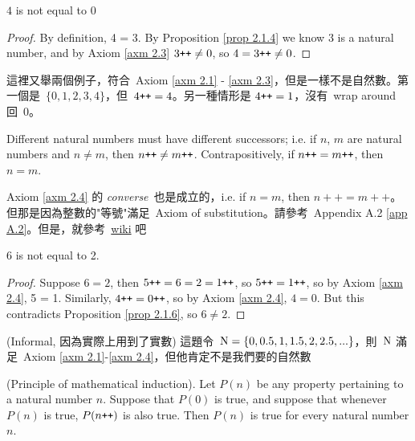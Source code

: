 \begin{proposition}\label{prop 2.1.6}
\(4\) is not equal to \(0\)
\begin{proof}
By definition, 4 = 3\INC. By Proposition \ref{prop 2.1.4} we know 3 is a natural number, and by Axiom \ref{axm 2.3} \(3\texttt{++} \neq 0\), so \(4 = 3\texttt{++} \neq 0\).
\end{proof}
\end{proposition}

\begin{example}\label{example 2.1.7}
這裡又舉兩個例子，符合\ Axiom \ref{axm 2.1} - \ref{axm 2.3}，但是一樣不是自然數。第一個是\ \(\{0,1,2,3,4\}\)，但\ \(4\texttt{++} = 4\)。另一種情形是 \(4\texttt{++} = 1\)，沒有\ wrap around 回\ 0。
\end{example}

\begin{axiom}\label{axm 2.4}
Different natural numbers must have different successors; i.e. if \(n\), \(m\) are natural numbers and \(n \neq m\), then \(n\texttt{++} \neq m\texttt{++}\). Contrapositively, if \(n\texttt{++} = m\texttt{++}\), then \(n = m\).
\end{axiom}

\begin{note}
Axiom \ref{axm 2.4} 的 \emph{converse}\ 也是成立的，i.e. if \(n = m\), then \(n++ = m++\)。但那是因為整數的"等號"滿足\ Axiom of substitution。請參考\ Appendix A.2 \ref{app A.2}。但是，就參考\ \href{https://www.wikiwand.com/en/Peano_axioms#/Formulation}{wiki} 吧
\end{note}

\begin{proposition}\label{prop 2.1.8}
6 is not equal to 2.
\begin{proof}
Suppose \( 6 = 2 \), then \( 5\texttt{++} = 6 = 2 = 1\texttt{++} \), so \(5\texttt{++} = 1\texttt{++} \), so by Axiom \ref{axm 2.4}, 5 = 1. Similarly, \(4\texttt{++} = 0\texttt{++}\), so by Axiom \ref{axm 2.4}, \(4 = 0\). But this contradicts Proposition \ref{prop 2.1.6}, so \(6 \neq 2\).
\end{proof}
\end{proposition}

\begin{example}\label{example 2.1.9}(Informal, 因為實際上用到了實數)
這題令\ \( \textup{N} = \{0, 0.5, 1, 1.5, 2, 2.5, ...\}\)，則\ \(\textup{N}\) 滿足\ Axiom \ref{axm 2.1}-\ref{axm 2.4}，但他肯定不是我們要的自然數
\end{example}

\begin{axiom}\label{axm 2.5} (Principle of mathematical induction). Let \(P(n)\) be any property pertaining to a natural number \(n\). Suppose that \(P(0)\) is true, and suppose that whenever \(P(n)\) is true, \(P(n\texttt{++})\) is also true. Then \(P(n)\) is true for every natural number \(n\).
\end{axiom}

